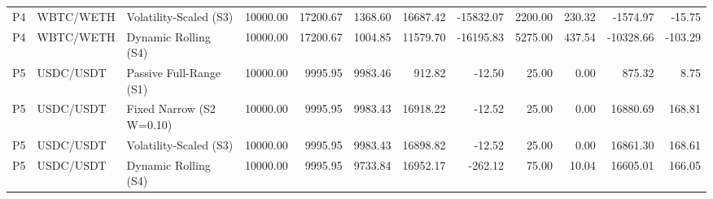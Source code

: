 \begin{tabular}{lllrrrrrrrrr}
P4 & WBTC/WETH & Volatility-Scaled (S3) & 10000.00 & 17200.67 & 1368.60 & 16687.42 & -15832.07 & 2200.00 & 230.32 & -1574.97 & -15.75 \\
P4 & WBTC/WETH & Dynamic Rolling (S4) & 10000.00 & 17200.67 & 1004.85 & 11579.70 & -16195.83 & 5275.00 & 437.54 & -10328.66 & -103.29 \\
P5 & USDC/USDT & Passive Full-Range (S1) & 10000.00 & 9995.95 & 9983.46 & 912.82 & -12.50 & 25.00 & 0.00 & 875.32 & 8.75 \\
P5 & USDC/USDT & Fixed Narrow (S2 W=0.10) & 10000.00 & 9995.95 & 9983.43 & 16918.22 & -12.52 & 25.00 & 0.00 & 16880.69 & 168.81 \\
P5 & USDC/USDT & Volatility-Scaled (S3) & 10000.00 & 9995.95 & 9983.43 & 16898.82 & -12.52 & 25.00 & 0.00 & 16861.30 & 168.61 \\
P5 & USDC/USDT & Dynamic Rolling (S4) & 10000.00 & 9995.95 & 9733.84 & 16952.17 & -262.12 & 75.00 & 10.04 & 16605.01 & 166.05 \\
\bottomrule
\end{tabular}
